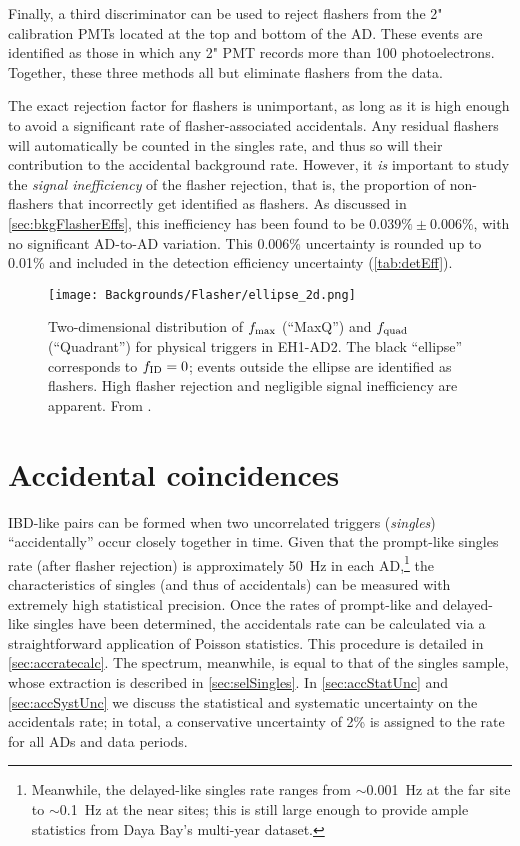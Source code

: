 \documentclass[../thesis.tex]{subfiles}
\begin{document}
Finally, a third discriminator can be used to reject flashers from the 2" calibration PMTs located at the top and bottom of the AD. These events are identified as those in which any 2" PMT records more than 100 photoelectrons. Together, these three methods all but eliminate flashers from the data.

The exact rejection factor for flashers is unimportant, as long as it is high enough to avoid a significant rate of flasher-associated accidentals. Any residual flashers will automatically be counted in the singles rate, and thus so will their contribution to the accidental background rate. However, it \emph{is} important to study the \emph{signal inefficiency} of the flasher rejection, that is, the proportion of non-flashers that incorrectly get identified as flashers. As discussed in \autoref{sec:bkgFlasherEffs}, this inefficiency has been found to be $0.039\% \pm 0.006\%$, with no significant AD-to-AD variation. This 0.006\% uncertainty is rounded up to 0.01\% and included in the detection efficiency uncertainty (\autoref{tab:detEff}).

\begin{figure}[ht!]
  \texttt{[image: Backgrounds/Flasher/ellipse\_2d.png]}
  \caption{Two-dimensional distribution of $f_{\mathrm{max}}$ (``MaxQ'') and $f_{\mathrm{quad}}$ (``Quadrant'') for physical triggers in EH1-AD2. The black ``ellipse'' corresponds to $f_{\mathrm{ID}} = 0$; events outside the ellipse are identified as flashers. High flasher rejection and negligible signal inefficiency are apparent. From \cite{flasherControl}.}
  \label{fig:bkgFlasherEllipse2DOverview}
\end{figure}

\section{Accidental coincidences}
\label{sec:accbkg}

IBD-like pairs can be formed when two uncorrelated triggers (\emph{singles}) ``accidentally'' occur closely together in time. Given that the prompt-like singles rate (after flasher rejection) is approximately 50~Hz in each AD,\footnote{Meanwhile, the delayed-like singles rate ranges from $\sim$0.001~Hz at the far site to $\sim$0.1~Hz at the near sites; this is still large enough to provide ample statistics from Daya Bay's multi-year dataset.} the characteristics of singles (and thus of accidentals) can be measured with extremely high statistical precision. Once the rates of prompt-like and delayed-like singles have been determined, the accidentals rate can be calculated via a straightforward application of Poisson statistics. This procedure is detailed in \autoref{sec:accratecalc}. The spectrum, meanwhile, is equal to that of the singles sample, whose extraction is described in \autoref{sec:selSingles}. In \autoref{sec:accStatUnc} and \autoref{sec:accSystUnc} we discuss the statistical and systematic uncertainty on the accidentals rate; in total, a conservative uncertainty of 2\% is assigned to the rate for all ADs and data periods.
\end{document}
